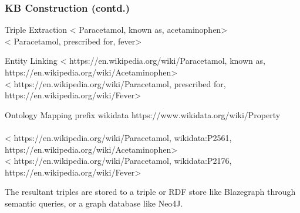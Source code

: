 \documentclass[t]{beamer}
\begin{document}
\begin{frame}
    \frametitle{KB Construction (contd.)}
    \begin{block}{Triple Extraction}
        \tiny{<{\color{red} Paracetamol}, {\color{teal} known as}, {\color{red} acetaminophen}>\\ <{\color{red} Paracetamol}, {\color{teal} prescribed for}, {\color{red} fever}>}
    \end{block}
    \begin{block}{Entity Linking}
        \tiny{<{\color{red} https://en.wikipedia.org/wiki/Paracetamol}, {\color{teal} known as}, {\color{red} https://en.wikipedia.org/wiki/Acetaminophen}>\\ <{\color{red} https://en.wikipedia.org/wiki/Paracetamol}, {\color{teal} prescribed for}, {\color{red} https://en.wikipedia.org/wiki/Fever}>}
    \end{block}
    \begin{block}{Ontology Mapping}
        \tiny{prefix {\color{teal} wikidata https://www.wikidata.org/wiki/Property}}\\~\\       \tiny{<{\color{red} https://en.wikipedia.org/wiki/Paracetamol}, {\color{teal} wikidata:P2561}, {\color{red} https://en.wikipedia.org/wiki/Acetaminophen}>\\ <{\color{red} https://en.wikipedia.org/wiki/Paracetamol}, {\color{teal} wikidata:P2176}, {\color{red} https://en.wikipedia.org/wiki/Fever}>}
    \end{block}
    \begin{itemize}
    \small{\item The resultant triples are stored to a triple or RDF store like Blazegraph through semantic queries, or a graph database like Neo4J.}
    \end{itemize}
\end{frame}
\end{document}

